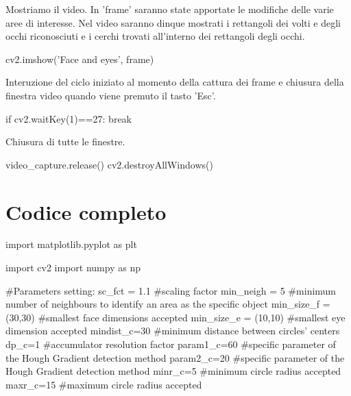 \documentclass[12pt]{article}
\begin{document}
{Mostriamo il video. In 'frame' saranno state apportate le modifiche delle varie aree di interesse. Nel video saranno dinque mostrati i rettangoli dei volti e degli occhi riconosciuti e i cerchi trovati all'interno dei rettangoli degli occhi.
\vspace{1cm}
 \begin{codice}
    cv2.imshow('Face and eyes', frame)
\end{codice}
\vspace{1cm}

Interuzione del ciclo iniziato al momento della cattura dei frame e chiusura della finestra video quando viene premuto il tasto 'Esc'.
\vspace{1cm}
\begin{codice}
    if cv2.waitKey(1)==27:
        break

\end{codice}
\vspace{1cm}

Chiusura di tutte le finestre.
\vspace{1cm}

\begin{codice}
video_capture.release()
cv2.destroyAllWindows()

\end{codice}

   
\pagebreak  	 					

\section{Codice completo}
\begin{codice}

import matplotlib.pyplot as plt

import cv2
import numpy as np

#Parameters setting:
sc_fct = 1.1              #scaling factor
min_neigh = 5             #minimum number of neighbours to identify an area as the specific object
min_size_f = (30,30)      #smallest face dimensions accepted
min_size_e = (10,10)      #smallest eye dimension accepted  
mindist_c=30               #minimum distance between circles' centers
dp_c=1                    #accumulator resolution factor
param1_c=60               #specific parameter of the Hough Gradient detection method 
param2_c=20              #specific parameter of the Hough Gradient detection method
minr_c=5                  #minimum circle radius accepted
maxr_c=15                  #maximum circle radius accepted





\end{codice}}
\end{document}
